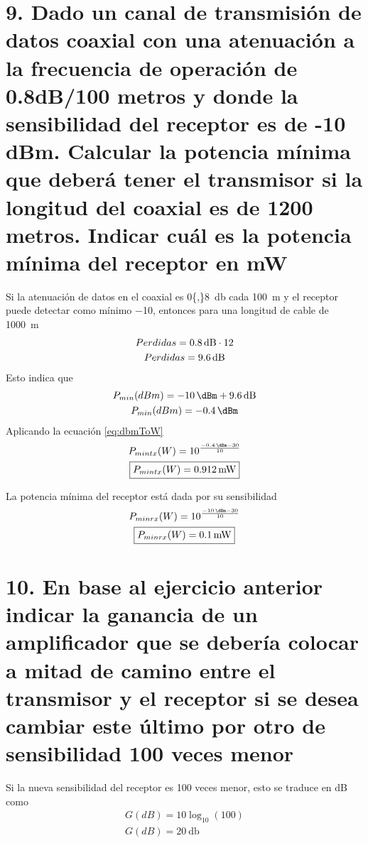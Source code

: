 \documentclass[11pt,a4paper]{article}
\begin{document}
\section*{9. Dado un canal de transmisión de datos coaxial con una atenuación a la
frecuencia de operación de 0.8dB/100 metros y donde la sensibilidad del
receptor es de -10 dBm. Calcular la potencia mínima que deberá tener el
transmisor si la longitud del coaxial es de 1200 metros. Indicar cuál es la
potencia mínima del receptor en mW}
Si la atenuación de datos en el coaxial es \SI{0{,}8}{\decibel} cada \SI{100}{\metre} y
el receptor puede detectar como mínimo \SI{-10}{\dBm}, entonces para una longitud de cable
de \SI{1000}{\metre}
\[
    \begin{gathered}
        Perdidas = \SI{0{,}8}{\decibel} \cdot 12 \\
        Perdidas = \SI{9{,}6}{\decibel}
    \end{gathered}
\]
Esto indica que
\[
    \begin{gathered}
        P_{min}(dBm) = \SI{-10}{\dBm} + \SI{9{,}6}{\decibel} \\
        P_{min}(dBm) = \SI{-0{,}4}{\dBm}
    \end{gathered}
\]
Aplicando la ecuación \eqref{eq:dbmToW}
\[
    \begin{gathered}
        P_{mintx}(W) = 10^{\frac{\SI{-0{,}4}{\dBm} - 30}{10}} \\
        \boxed{P_{mintx}(W) = \SI{0{,}912}{\milli\watt}}
    \end{gathered}
\]

La potencia mínima del receptor está dada por su sensibilidad
\[
    \begin{gathered}
        P_{minrx}(W) = 10^{\frac{\SI{-10}{\dBm} - 30}{10}} \\
        \boxed{P_{minrx}(W) = \SI{0{,}1}{\milli\watt}}
    \end{gathered}
\]

\section*{10. En base al ejercicio anterior indicar la ganancia de un amplificador que se
debería colocar a mitad de camino entre el transmisor y el receptor si se desea
cambiar este último por otro de sensibilidad 100 veces menor}
Si la nueva sensibilidad del receptor es 100 veces menor, esto se traduce en dB como
\[
    \begin{gathered}
        G(dB) = 10\log_{10} (100) \\
        G(dB) = \SI{20}{\decibel}
    \end{gathered}
\]
\end{document}
